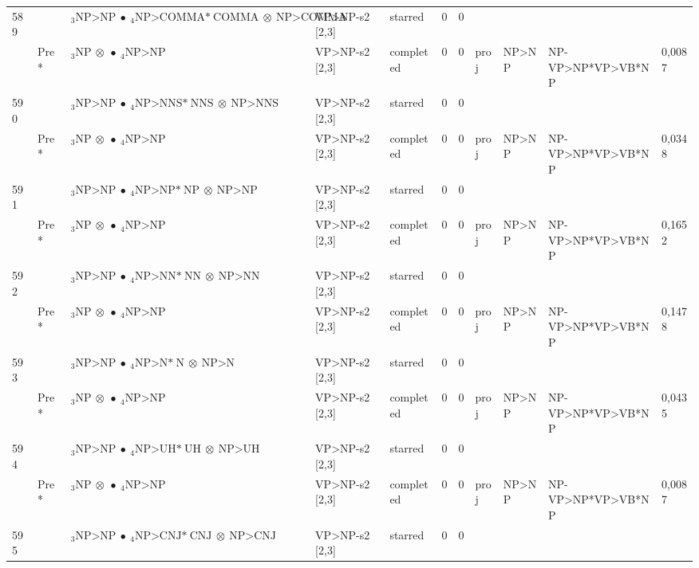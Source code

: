 \documentclass[10pt]{article}
\begin{document}
\begin{longtable}[htbp]{lllllllllll}
589 & & $ {}_3 \textrm{NP>NP} \  \bullet \ {}_{4} \textrm{NP>COMMA*} \ \textrm{COMMA} \  \otimes \ \textrm{NP>COMMA} $ & VP>NP-s2 [2,3] & starred & 0 & 0 & & & & \\ 
 & Pre *& $ {}_3 \textrm{NP} \  \otimes \  \bullet \ {}_{4} \textrm{NP>NP} $ & VP>NP-s2 [2,3] & completed & 0 & 0 & proj & NP>NP & NP-VP>NP*VP>VB*NP & 0,0087 \\ 
590 & & $ {}_3 \textrm{NP>NP} \  \bullet \ {}_{4} \textrm{NP>NNS*} \ \textrm{NNS} \  \otimes \ \textrm{NP>NNS} $ & VP>NP-s2 [2,3] & starred & 0 & 0 & & & & \\ 
 & Pre *& $ {}_3 \textrm{NP} \  \otimes \  \bullet \ {}_{4} \textrm{NP>NP} $ & VP>NP-s2 [2,3] & completed & 0 & 0 & proj & NP>NP & NP-VP>NP*VP>VB*NP & 0,0348 \\ 
591 & & $ {}_3 \textrm{NP>NP} \  \bullet \ {}_{4} \textrm{NP>NP*} \ \textrm{NP} \  \otimes \ \textrm{NP>NP} $ & VP>NP-s2 [2,3] & starred & 0 & 0 & & & & \\ 
 & Pre *& $ {}_3 \textrm{NP} \  \otimes \  \bullet \ {}_{4} \textrm{NP>NP} $ & VP>NP-s2 [2,3] & completed & 0 & 0 & proj & NP>NP & NP-VP>NP*VP>VB*NP & 0,1652 \\ 
592 & & $ {}_3 \textrm{NP>NP} \  \bullet \ {}_{4} \textrm{NP>NN*} \ \textrm{NN} \  \otimes \ \textrm{NP>NN} $ & VP>NP-s2 [2,3] & starred & 0 & 0 & & & & \\ 
 & Pre *& $ {}_3 \textrm{NP} \  \otimes \  \bullet \ {}_{4} \textrm{NP>NP} $ & VP>NP-s2 [2,3] & completed & 0 & 0 & proj & NP>NP & NP-VP>NP*VP>VB*NP & 0,1478 \\ 
593 & & $ {}_3 \textrm{NP>NP} \  \bullet \ {}_{4} \textrm{NP>N*} \ \textrm{N} \  \otimes \ \textrm{NP>N} $ & VP>NP-s2 [2,3] & starred & 0 & 0 & & & & \\ 
 & Pre *& $ {}_3 \textrm{NP} \  \otimes \  \bullet \ {}_{4} \textrm{NP>NP} $ & VP>NP-s2 [2,3] & completed & 0 & 0 & proj & NP>NP & NP-VP>NP*VP>VB*NP & 0,0435 \\ 
594 & & $ {}_3 \textrm{NP>NP} \  \bullet \ {}_{4} \textrm{NP>UH*} \ \textrm{UH} \  \otimes \ \textrm{NP>UH} $ & VP>NP-s2 [2,3] & starred & 0 & 0 & & & & \\ 
 & Pre *& $ {}_3 \textrm{NP} \  \otimes \  \bullet \ {}_{4} \textrm{NP>NP} $ & VP>NP-s2 [2,3] & completed & 0 & 0 & proj & NP>NP & NP-VP>NP*VP>VB*NP & 0,0087 \\ 
595 & & $ {}_3 \textrm{NP>NP} \  \bullet \ {}_{4} \textrm{NP>CNJ*} \ \textrm{CNJ} \  \otimes \ \textrm{NP>CNJ} $ & VP>NP-s2 [2,3] & starred & 0 & 0 & & & & \\ 

\end{longtable}
\end{document}

